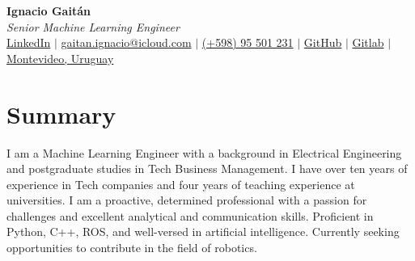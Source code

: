 \documentclass[letterpaper,11pt]{article}
\begin{document}
\begin{center}
    \textbf{\LARGE Ignacio Gaitán} \\ \vspace{2ex}
    \textit{Senior Machine Learning Engineer} \\ \vspace{2ex}
    \small
    \faLinkedinSquare \hspace{.5pt} \href{https://www.linkedin.com/in/ignacio-gaitan}{LinkedIn}
    $|$
    \faAt \hspace{.5pt} \href{mailto:gaitan.ignacio@icloud.com}{gaitan.ignacio@icloud.com}
    $|$
    \faMobile \hspace{.5pt} \href{tel:+59895501231}{(+598) 95 501 231}
    $|$
    \faGithub \hspace{.5pt} \href{https://github.com/gaitanignacio}{GitHub}
    $|$
    \faGithub \hspace{.5pt} \href{https://gitlab.com/gaitan.ignacio}{Gitlab}
    $|$
    \faMapMarker \hspace{.5pt} \href{https://www.google.com/maps/place/Prof.+Juan+Carlos+Sabat+Pebet+1234,+11300+Montevideo,+Departamento+de+Montevideo,+Uruguay/@-34.9044985,-56.1366609,17z/data=!3m1!4b1!4m6!3m5!1s0x959f813e56b3cedd:0x5a415e79543b2770!8m2!3d-34.9044985!4d-56.134086!16s%2Fg%2F11pysbccyt?entry=ttu}{Montevideo, Uruguay}
\end{center}

\vspace{-2ex}

\section*{Summary}
I am a Machine Learning Engineer with a background in Electrical Engineering and postgraduate studies in Tech Business Management. I have over ten years of experience in Tech companies and four years of teaching experience at universities. I am a proactive, determined professional with a passion for challenges and excellent analytical and communication skills. Proficient in Python, C++, ROS, and well-versed in artificial intelligence. Currently seeking opportunities to contribute in the field of robotics.
\end{document}
